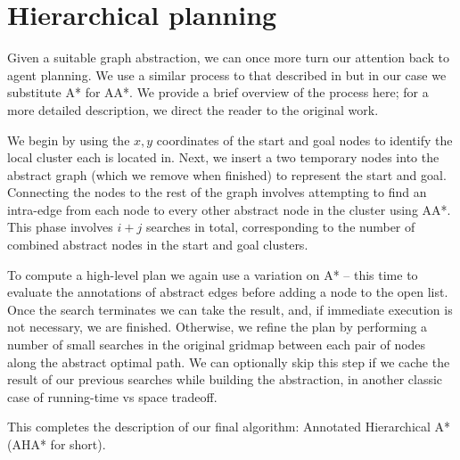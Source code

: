 \section{Hierarchical planning}
Given a suitable graph abstraction, we can once more turn our attention back to agent planning. 
We use a similar process to that described in \cite{botea04} but in our case we substitute A* for AA*.
We provide a brief overview of the process here; for a more detailed description, we direct the reader to the original work.
\par \indent
We begin by using the $x,y$ coordinates of the start and goal  nodes to identify the local cluster each is located in. 
Next, we insert a two temporary nodes into the abstract graph (which we remove when finished) to represent the start and goal.
Connecting the nodes to the rest of the graph involves attempting to find an intra-edge from each node to every other abstract node in the cluster using AA*. 
This phase involves $i+j$ searches in total, corresponding to the number of combined abstract nodes in the start and goal clusters.
\par \indent
To compute a high-level plan we again use a variation on A* -- this time to evaluate the annotations of abstract edges before adding a node to the open list.
Once the search terminates we can take the result, and, if immediate execution is not necessary, we are finished. 
Otherwise, we refine the plan by performing a number of small searches in the original gridmap between each pair of nodes along the abstract optimal path. 
We can optionally skip this step if we cache the result of our previous searches while building the abstraction, in another classic case of running-time vs space tradeoff. 
\par \indent
This completes the description of our final algorithm: Annotated Hierarchical A* (AHA* for short).
